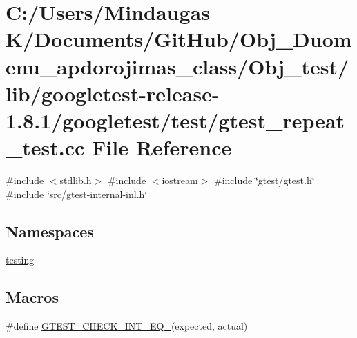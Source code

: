 \hypertarget{_obj__test_2lib_2googletest-release-1_88_81_2googletest_2test_2gtest__repeat__test_8cc}{}\section{C\+:/\+Users/\+Mindaugas K/\+Documents/\+Git\+Hub/\+Obj\+\_\+\+Duomenu\+\_\+apdorojimas\+\_\+class/\+Obj\+\_\+test/lib/googletest-\/release-\/1.8.1/googletest/test/gtest\+\_\+repeat\+\_\+test.cc File Reference}
\label{_obj__test_2lib_2googletest-release-1_88_81_2googletest_2test_2gtest__repeat__test_8cc}
{\ttfamily \#include $<$stdlib.\+h$>$}\newline
{\ttfamily \#include $<$iostream$>$}\newline
{\ttfamily \#include \char`\"{}gtest/gtest.\+h\char`\"{}}\newline
{\ttfamily \#include \char`\"{}src/gtest-\/internal-\/inl.\+h\char`\"{}}\newline
\subsection*{Namespaces}
\begin{DoxyCompactItemize}
\item 
 \mbox{\hyperlink{namespacetesting}{testing}}
\end{DoxyCompactItemize}
\subsection*{Macros}
\begin{DoxyCompactItemize}
\item 
\#define \mbox{\hyperlink{_obj__test_2lib_2googletest-release-1_88_81_2googletest_2test_2gtest__repeat__test_8cc_a7e5ba7c523079f679398b4c730184de3}{G\+T\+E\+S\+T\+\_\+\+C\+H\+E\+C\+K\+\_\+\+I\+N\+T\+\_\+\+E\+Q\+\_\+}}(expected,  actual)
\end{DoxyCompactItemize}
